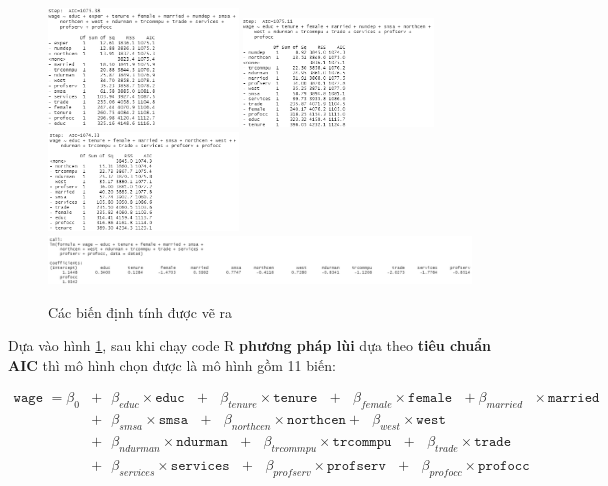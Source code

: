 \begin{figure}[H]
	\includegraphics[width=0.45\textwidth]{../Photo Of Result/stepAIC(4)-6}
	\includegraphics[width=0.45\textwidth]{../Photo Of Result/stepAIC(4)-7}
	\includegraphics[width=0.45\textwidth]{../Photo Of Result/stepAIC(4)-8}
	\includegraphics[width=\textwidth]{../Photo Of Result/stepAIC(4)-9}
	\caption{Các biến định tính được vẽ ra}
	\label{stepAIC}
\end{figure}

Dựa vào hình \ref{stepAIC}, sau khi chạy code R \textbf{phương pháp lùi} dựa theo \textbf{tiêu chuẩn AIC} thì mô hình chọn được là mô hình gồm 11 biến:

\begin{equation*}
	\begin{split}
		\texttt{wage } = \beta_0 &+ \text{ } \beta_{educ}\times \texttt{educ} \text{ } + \text{ } \beta_{tenure} \times \texttt{tenure} \text{ }+\text{ }\beta_{female} \times \texttt{female} \text{ } + \beta_{married} \text{ } \times \texttt{married}\\ &+\text{ }\beta_{smsa} \times\texttt{smsa}\text{ } +\text{ }\beta_{northcen}\times \texttt{northcen} +\text{ }\beta_{west} \times \texttt{west} \\
		&+ \text{ }\beta_{ndurman}\times \texttt{ndurman}\text{ } +\text{ }\beta_{trcommpu} \times\texttt{trcommpu}\text{ } +\text{ }\beta_{trade}\times \texttt{trade} \\
		&+\text{ }\beta_{services} \times \texttt{services} \text{ } 
		+ \text{ }\beta_{profserv} \times \texttt{profserv} \text{ } + \text{ }\beta_{profocc}\times \texttt{profocc}
	\end{split}
\end{equation*}

